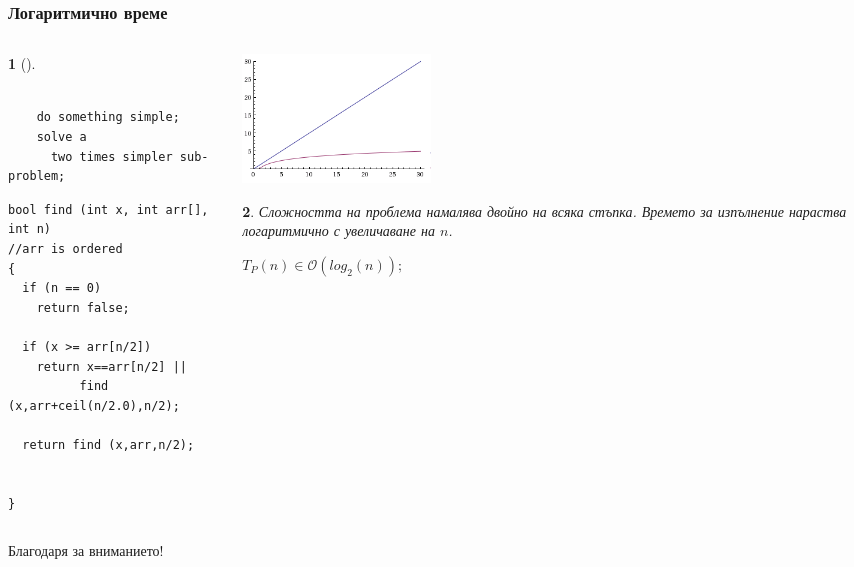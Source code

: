 \documentclass{beamer}
\newtheorem*{remark}{}
\begin{document}
\begin{frame}[fragile]
\frametitle{Логаритмично време}

\vspace{-30px}

\begin{columns}[t]
  \begin{column}{0.6\textwidth}
\begin{remark}[]
  \begin{lstlisting}[mathescape]
  
    do something simple;
    solve a 
      two times simpler sub-problem;

  \end{lstlisting}
\end{remark}

\begin{flushleft}
\begin{lstlisting}
bool find (int x, int arr[], int n)
//arr is ordered
{
  if (n == 0)
    return false;

  if (x >= arr[n/2])
    return x==arr[n/2] || 
          find (x,arr+ceil(n/2.0),n/2);

  return find (x,arr,n/2);


}
\end{lstlisting}
\end{flushleft}




  \end{column}
  \begin{column}{0.4\textwidth}

   \includegraphics[width=5cm]{images/logf}
    \begin{flushleft}
    \begin{remark}
      Сложността на проблема намалява двойно на всяка стъпка.
      Времето за изпълнение нараства логаритмично с увеличаване на $n$.

      $T_P(n) \in \mathcal{O}(log_2(n));$
    \end{remark}
      
    \end{flushleft}


  \end{column}
\end{columns}

\end{frame}

\begin{frame}
\centerline{Благодаря за вниманието!}
\end{frame}
\end{document}
